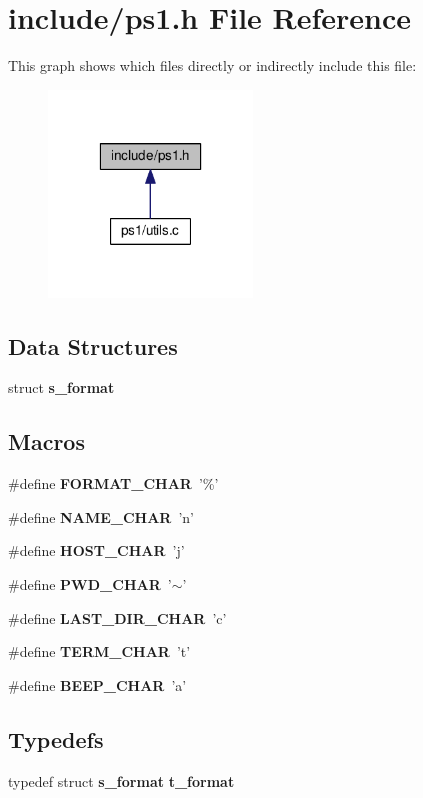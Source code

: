 \section{include/ps1.h File Reference}
\label{ps1_8h}
This graph shows which files directly or indirectly include this file\-:\nopagebreak
\begin{figure}[H]
\begin{center}
\leavevmode
\includegraphics[width=154pt]{ps1_8h__dep__incl}
\end{center}
\end{figure}
\subsection*{Data Structures}
\begin{DoxyCompactItemize}
\item 
struct {\bf s\-\_\-format}
\end{DoxyCompactItemize}
\subsection*{Macros}
\begin{DoxyCompactItemize}
\item 
\#define {\bf F\-O\-R\-M\-A\-T\-\_\-\-C\-H\-A\-R}~'\%'
\item 
\#define {\bf N\-A\-M\-E\-\_\-\-C\-H\-A\-R}~'n'
\item 
\#define {\bf H\-O\-S\-T\-\_\-\-C\-H\-A\-R}~'j'
\item 
\#define {\bf P\-W\-D\-\_\-\-C\-H\-A\-R}~'$\sim$'
\item 
\#define {\bf L\-A\-S\-T\-\_\-\-D\-I\-R\-\_\-\-C\-H\-A\-R}~'c'
\item 
\#define {\bf T\-E\-R\-M\-\_\-\-C\-H\-A\-R}~'t'
\item 
\#define {\bf B\-E\-E\-P\-\_\-\-C\-H\-A\-R}~'a'
\end{DoxyCompactItemize}
\subsection*{Typedefs}
\begin{DoxyCompactItemize}
\item 
typedef struct {\bf s\-\_\-format} {\bf t\-\_\-format}
\end{DoxyCompactItemize}
